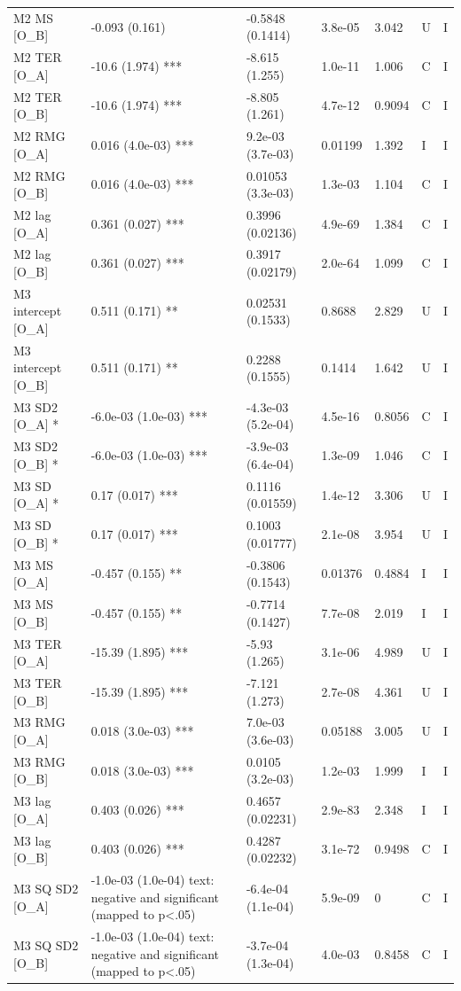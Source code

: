 {\begin{longtable}{@{}p{.245\linewidth}p{.17\linewidth}p{.17\linewidth}p{.085\linewidth}p{.060\linewidth}p{.08\linewidth}p{.07\linewidth}@{}}
M2 MS [O\_B] & -0.093 (0.161) & -0.5848 (0.1414) & 3.8e-05 & 3.042 & U & I\\
M2 TER [O\_A] & -10.6 (1.974) *** & -8.615 (1.255) & 1.0e-11 & 1.006 & C & I\\
M2 TER [O\_B] & -10.6 (1.974) *** & -8.805 (1.261) & 4.7e-12 & 0.9094 & C & I\\
M2 RMG [O\_A] & 0.016 (4.0e-03) *** & 9.2e-03 (3.7e-03) & 0.01199 & 1.392 & I & I\\
M2 RMG [O\_B] & 0.016 (4.0e-03) *** & 0.01053 (3.3e-03) & 1.3e-03 & 1.104 & C & I\\
M2 lag [O\_A] & 0.361 (0.027) *** & 0.3996 (0.02136) & 4.9e-69 & 1.384 & C & I\\
M2 lag [O\_B] & 0.361 (0.027) *** & 0.3917 (0.02179) & 2.0e-64 & 1.099 & C & I\\
M3 intercept [O\_A] & 0.511 (0.171) ** & 0.02531 (0.1533) & 0.8688 & 2.829 & U & I\\
M3 intercept [O\_B] & 0.511 (0.171) ** & 0.2288 (0.1555) & 0.1414 & 1.642 & U & I\\
M3 SD2 [O\_A] * & -6.0e-03 (1.0e-03) *** & -4.3e-03 (5.2e-04) & 4.5e-16 & 0.8056 & C & I\\
M3 SD2 [O\_B] * & -6.0e-03 (1.0e-03) *** & -3.9e-03 (6.4e-04) & 1.3e-09 & 1.046 & C & I\\
M3 SD [O\_A] * & 0.17 (0.017) *** & 0.1116 (0.01559) & 1.4e-12 & 3.306 & U & I\\
M3 SD [O\_B] * & 0.17 (0.017) *** & 0.1003 (0.01777) & 2.1e-08 & 3.954 & U & I\\
M3 MS [O\_A] & -0.457 (0.155) ** & -0.3806 (0.1543) & 0.01376 & 0.4884 & I & I\\
M3 MS [O\_B] & -0.457 (0.155) ** & -0.7714 (0.1427) & 7.7e-08 & 2.019 & I & I\\
M3 TER [O\_A] & -15.39 (1.895) *** & -5.93 (1.265) & 3.1e-06 & 4.989 & U & I\\
M3 TER [O\_B] & -15.39 (1.895) *** & -7.121 (1.273) & 2.7e-08 & 4.361 & U & I\\
M3 RMG [O\_A] & 0.018 (3.0e-03) *** & 7.0e-03 (3.6e-03) & 0.05188 & 3.005 & U & I\\
M3 RMG [O\_B] & 0.018 (3.0e-03) *** & 0.0105 (3.2e-03) & 1.2e-03 & 1.999 & I & I\\
M3 lag [O\_A] & 0.403 (0.026) *** & 0.4657 (0.02231) & 2.9e-83 & 2.348 & I & I\\
M3 lag [O\_B] & 0.403 (0.026) *** & 0.4287 (0.02232) & 3.1e-72 & 0.9498 & C & I\\
M3 SQ SD2 [O\_A] & -1.0e-03 (1.0e-04) text: negative and significant (mapped to p<.05) & -6.4e-04 (1.1e-04) & 5.9e-09 & 0 & C & I\\
M3 SQ SD2 [O\_B] & -1.0e-03 (1.0e-04) text: negative and significant (mapped to p<.05) & -3.7e-04 (1.3e-04) & 4.0e-03 & 0.8458 & C & I\\
\end{longtable}}
